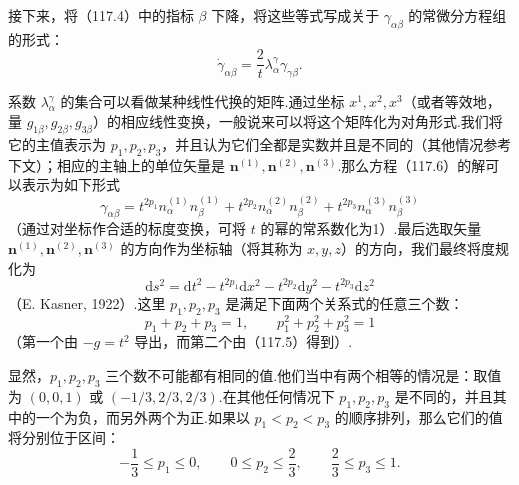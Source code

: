 接下来，将（117.4）中的指标 $\beta$ 下降，将这些等式写成关于 $\gamma_{\alpha\beta}$ 的常微分方程组的形式：
\begin{equation}
  \dot{\gamma}_{\alpha\beta}
  =\frac{2}{t}\lambda_{\alpha}^{\gamma}\gamma_{\gamma\beta}.
\end{equation}

系数 $\lambda_{\alpha}^{\gamma}$ 的集合可以看做某种线性代换的矩阵.通过坐标 $x^{1},x^{2},x^{3}$（或者等效地，量 $g_{1\beta},g_{2\beta},g_{3\beta}$）的相应线性变换，一般说来可以将这个矩阵化为对角形式.我们将它的主值表示为 $p_{1},p_{2},p_{3}$，并且认为它们全都是实数并且是不同的（其他情况参考下文）；相应的主轴上的单位矢量是 $\boldsymbol{n}^{(1)},\boldsymbol{n}^{(2)},\boldsymbol{n}^{(3)}$.那么方程（117.6）的解可以表示为如下形式
\begin{equation}
  \gamma_{\alpha\beta}
  =t^{2p_{1}}n_{\alpha}^{(1)}n_{\beta}^{(1)}
  +t^{2p_{2}}n_{\alpha}^{(2)}n_{\beta}^{(2)}
  +t^{2p_{3}}n_{\alpha}^{(3)}n_{\beta}^{(3)}
\end{equation}
（通过对坐标作合适的标度变换，可将 $t$ 的幂的常系数化为1）.最后选取矢量 $\boldsymbol{n}^{(1)},\boldsymbol{n}^{(2)},\boldsymbol{n}^{(3)}$ 的方向作为坐标轴（将其称为 $x,y,z$）的方向，我们最终将度规化为
\begin{equation}
  \mathrm{d}s^{2}=\mathrm{d}t^{2}
  -t^{2p_{1}}\mathrm{d}x^{2}
  -t^{2p_{2}}\mathrm{d}y^{2}
  -t^{2p_{3}}\mathrm{d}z^{2}
\end{equation}
（E. Kasner, 1922）.这里 $p_{1},p_{2},p_{3}$ 是满足下面两个关系式的任意三个数：
\begin{equation}
  p_{1}+p_{2}+p_{3}=1,\qquad
  p_{1}^{2}+p_{2}^{2}+p_{3}^{2}=1
\end{equation}
（第一个由 $-g=t^{2}$ 导出，而第二个由（117.5）得到）.

显然，$p_{1},p_{2},p_{3}$ 三个数不可能都有相同的值.他们当中有两个相等的情况是：取值为 $(0,0,1)$ 或 $(-1/3,2/3,2/3)$.在其他任何情况下 $p_{1},p_{2},p_{3}$ 是不同的，并且其中的一个为负，而另外两个为正.如果以 $p_{1}<p_{2}<p_{3}$ 的顺序排列，那么它们的值将分别位于区间：
\begin{equation}
  -\frac{1}{3}\leqslant p_{1}\leqslant0,\qquad
  0\leqslant p_{2}\leqslant\frac{2}{3},\qquad
  \frac{2}{3}\leqslant p_{3}\leqslant1.
\end{equation}

